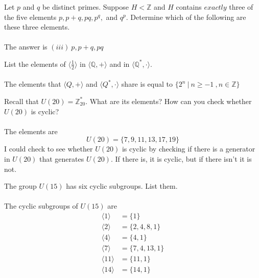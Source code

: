 \documentclass[titlepage]{article}
\newenvironment{problem}[2][Problem]{\begin{trivlist}
\item[\hskip \labelsep {\bfseries #1}\hskip \labelsep {\bfseries #2.}]}{\end{trivlist}}
\begin{document}
\begin{problem}{8}
Let $p$ and $q$ be distinct primes. Suppose $H < \mathbb{Z}$ and $H$ contains $exactly$ three of the five elements $p, p+q, pq, p^q, $ and $q^p$. Determine which of the following are these three elements.
\\ \\ 
The answer is $(iii)\  p, p+q, pq$
\end{problem}

\begin{problem}{9}
List the elements of $\langle\frac{1}{2}\rangle$ in $\langle \mathbb{Q}, + \rangle$ and in $\langle \mathbb{Q}^*, \cdot \rangle$. 
\\
\\
The elements that $\langle Q, + \rangle $ and $\langle Q^*, \cdot \rangle$ share is equal to $\{ 2^n \ | \ n \geq -1\ , n \in \mathbb{Z}\}$
\end{problem}

\begin{problem}{10}
Recall that $U(20) = \mathbb{Z}^*_{20}$. What are its elements? How can you check whether $U(20)$ is cyclic? \\ \\
The elements are $$ U(20) = \{7,9,11,13,17,19\}$$
I could check to see whether $U(20)$ is cyclic by checking if there is a generator in $U(20)$ that generates $U(20)$. If there is, it is cyclic, but if there isn't it is not.

\end{problem}

\begin{problem}{11}
The group $U(15)$ has six cyclic subgroups. List them.
\\ \\
The cyclic subgroups of $U(15)$ are
\begin{align*}
\langle 1 \rangle &= \{1\} \\
 \langle 2 \rangle &= \{2,4,8,1\}\\
 \langle 4 \rangle &= \{4,1\}\\
\langle 7 \rangle &= \{7,4,13,1\}\\
\langle 11 \rangle &= \{11,1\} \\
\langle 14 \rangle &= \{14,1\}\\
\end{align*}
\end{problem}
\end{document}
